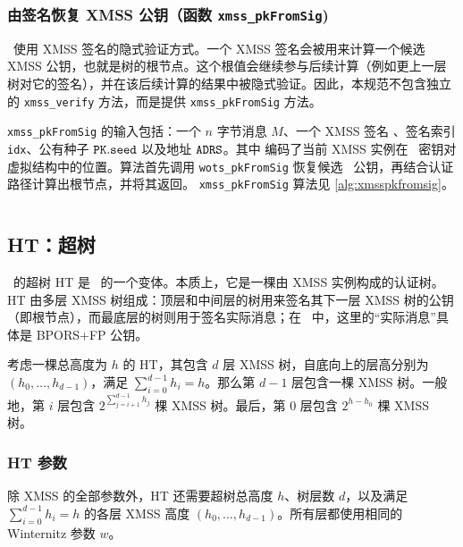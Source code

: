 \subsubsection{由签名恢复 XMSS 公钥（函数 \texttt{xmss\_pkFromSig})}

\SPHINCSA\ 使用 XMSS 签名的隐式验证方式。一个 XMSS 签名会被用来计算一个候选 XMSS 公钥，也就是树的根节点。这个根值会继续参与后续计算（例如更上一层树对它的签名），并在该后续计算的结果中被隐式验证。因此，本规范不包含独立的 \texttt{xmss\_verify} 方法，而是提供 \texttt{xmss\_pkFromSig} 方法。

\texttt{xmss\_pkFromSig} 的输入包括：一个 $n$ 字节消息 $M$、一个 XMSS 签名 \sigxmss、签名索引 \texttt{idx}、公有种子 $\pk.\seed$ 以及地址 $\mathtt{ADRS}$。其中 \ADRS 编码了当前 XMSS 实例在 \SPHINCSA\ 密钥对虚拟结构中的位置。算法首先调用 \texttt{wots\_pkFromSig} 恢复候选 \WOTSCS\ 公钥，再结合认证路径计算出根节点，并将其返回。 \texttt{xmss\_pkFromSig} 算法见 \cref{alg:xmsspkfromsig}。

\begin{algorithm}
\inputminted[breaklines,linenos,tabsize=2,mathescape,escapeinside=||]{C}{paper/code/xmss_pkFromSig.cs}
\caption{\texttt{xmss\_pkFromSig} --- 由 XMSS 签名恢复 XMSS 公钥。}
\label{alg:xmsspkfromsig}
\end{algorithm}

\subsection{HT：超树}

\SPHINCSA\ 的超树 HT 是 \XMSSMT\ 的一个变体。本质上，它是一棵由 XMSS 实例构成的认证树。HT 由多层 XMSS 树组成：顶层和中间层的树用来签名其下一层 XMSS 树的公钥（即根节点），而最底层的树则用于签名实际消息；在 \SPHINCSA\ 中，这里的“实际消息”具体是 BPORS+FP 公钥。

考虑一棵总高度为 $h$ 的 HT，其包含 $d$ 层 XMSS 树，自底向上的层高分别为 $(h_0,\ldots,h_{d-1})$，满足 $\sum_{i=0}^{d-1} h_i = h$。那么第 $d-1$ 层包含一棵 XMSS 树。一般地，第 $i$ 层包含 $2^{\sum_{j=i+1}^{d-1} h_j}$ 棵 XMSS 树。最后，第 $0$ 层包含 $2^{h-h_0}$ 棵 XMSS 树。

\subsubsection{HT 参数}
\label{sec:htpara}
除 XMSS 的全部参数外，HT 还需要超树总高度 $h$、树层数 $d$，以及满足 $\sum_{i=0}^{d-1} h_i = h$ 的各层 XMSS 高度 $(h_0,\ldots,h_{d-1})$。所有层都使用相同的 Winternitz 参数 $w$。

